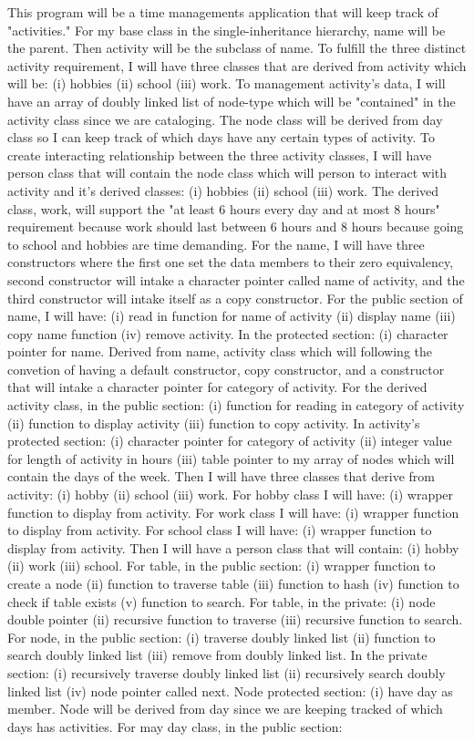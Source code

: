 \documentclass[11pt, a4paper]{article}
\begin{document}
This program will be a time managements application that will keep track of "activities." For my base class in the single-inheritance hierarchy, name will be the parent. Then activity will be the subclass of name. To fulfill the three distinct activity requirement, I will have three classes that are derived from activity which will be: (i) hobbies (ii) school (iii) work. To management activity's data, I will have  an array of doubly linked list of node-type which will be "contained" in the activity class since we are cataloging. The node class will be derived from day class so I can keep track of which days have any certain types of activity. To create interacting relationship between the three activity classes, I will have person class that will contain the node class which will person to interact with activity and it's derived classes: (i) hobbies (ii) school (iii) work. The derived class, work, will support the "at least 6 hours every day and at most 8 hours" requirement because work should last between 6 hours and 8 hours because going to school and hobbies are time demanding. For the name, I will have three constructors where the first one set the data members to their zero equivalency, second constructor will intake a character pointer called name of activity, and the third constructor will intake itself as a copy constructor. For the public section of name, I will have: (i) read in function for name of activity (ii) display name (iii) copy name function (iv) remove activity. In the protected section: (i) character pointer for name. Derived from name, activity class which will following the convetion of having a default constructor, copy constructor, and a constructor that will intake a character pointer for category of activity. For the derived activity class, in the public section: (i) function for reading in category of activity (ii) function to display activity (iii) function to copy activity. In activity's protected section: (i) character pointer for category of activity (ii) integer value for length of activity in hours (iii) table pointer to my array of nodes which will contain the days of the week. Then I will have three classes that derive from activity: (i) hobby (ii) school (iii) work. For hobby class I will have: (i) wrapper function to display from activity.  For work class I will have: (i) wrapper function to display from activity. For school class I will have: (i) wrapper function to display from activity. Then I will have a person class that will contain: (i) hobby (ii) work (iii) school. For table, in the public section: (i) wrapper function to create a node (ii) function to traverse table (iii) function to hash (iv) function to check if table exists (v) function to search. For table, in the private: (i) node double pointer (ii) recursive function to traverse (iii) recursive function to search. For node, in the public section: (i) traverse doubly linked list (ii) function to search doubly linked list (iii) remove from doubly linked list. In the private section: (i) recursively traverse doubly linked list (ii) recursively search doubly linked list (iv) node pointer called next. Node protected section: (i) have day as member. Node will be derived from day since we are keeping tracked of which days has activities. For may day class, in the public section: 
\end{document}
